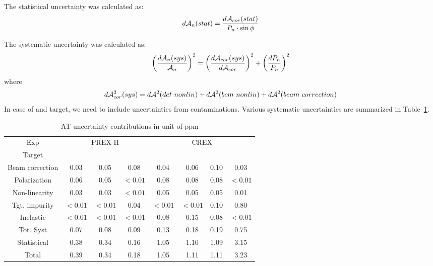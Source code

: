 The statistical uncertainty was calculated as:
\begin{equation}
    d\mathcal{A}_n(stat) = \frac{d\mathcal{A}_{cor}(stat)}{P_n \cdot \sin\phi}
\end{equation}

The systematic uncertainty was calculated as:
\begin{equation}
    \left( \frac{d\mathcal{A}_n(sys)}{\mathcal{A}_n} \right)^2 = 
	\left( \frac{d\mathcal{A}_{cor}(sys)}{d\mathcal{A}_{cor}} \right)^2
	+ \left( \frac{dP_n}{P_n}\right)^2 
\end{equation}
where
\begin{equation}
    d\mathcal{A}^2_{cor}(sys) = d\mathcal{A}^2(det\ nonlin) + d\mathcal{A}^2(bcm\ nonlin) + d\mathcal{A}^2(beam\ correction)
\end{equation}
In case of \Pb and \Ca target, we need to include uncertainties from contaminations.
Various systematic uncertainties are summarized in Table~\ref{tab:AT_uncertainties}.
\begin{table}[!h]
    \centering
    \begin{tabular}{c c c c | c c c c}
	\hline
	Exp & \multicolumn{3}{c|}{PREX-II}  & \multicolumn{4}{c}{CREX}	\\
	Target	& \C	& \ca	& \Pb	& \C	& \ca	& \Ca	& \Pb	\\
	\hline
	Beam correction & 0.03  & 0.05  & 0.08  & 0.04  & 0.06  & 0.10  & 0.03	\\
	Polarization    & 0.06  & 0.05  & $<0.01$ & 0.08  & 0.08  & 0.08  & $<0.01$	\\
	Non-linearity   & 0.03  & 0.03  & $<0.01$ & 0.05  & 0.05  & 0.05  & 0.01	\\
	Tgt. impurity   & $<0.01$ & $<0.01$ & 0.04  & $<0.01$ & $<0.01$ & 0.10  & 0.80	\\
	Inelastic	& $<0.01$ & $<0.01$ & $<0.01$ & 0.08  & 0.15  & 0.08  & $<0.01$	\\
	\hline	
	Tot. Syst	& 0.07  & 0.08  & 0.09  & 0.13  & 0.18  & 0.19  & 0.75	\\
	Statistical	& 0.38  & 0.34  & 0.16  & 1.05  & 1.10  & 1.09  & 3.15	\\
	Total		& 0.39  & 0.34  & 0.18  & 1.05  & 1.11  & 1.11  & 3.23	\\
	\hline
    \end{tabular}
    \caption{AT uncertainty contributions in unit of ppm}
    \label{tab:AT_uncertainties}
\end{table}

